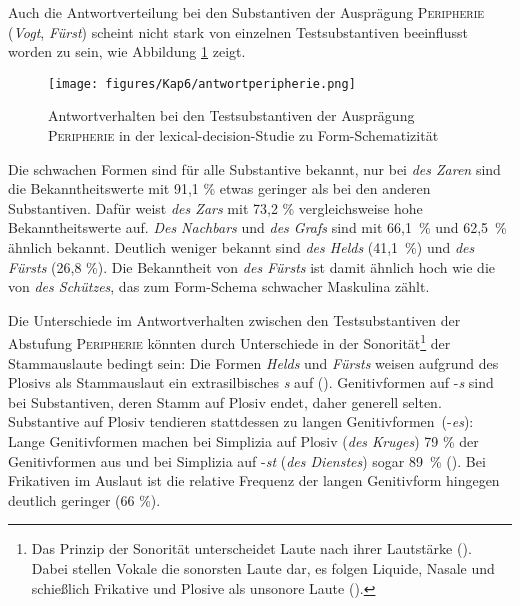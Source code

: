 Auch die Antwortverteilung bei den Substantiven der Ausprägung \textsc{Peripherie} (\textit{Vogt}, \textit{Fürst}) scheint nicht stark von einzelnen Testsubstantiven beeinflusst worden zu sein, wie Abbildung \ref{schemaantperi} zeigt.

\begin{figure}
\texttt{[image: figures/Kap6/antwortperipherie.png]} 
\caption{Antwortverhalten bei den Testsubstantiven der Ausprägung \textsc{Peripherie} in der lexical-decision-Studie zu Form-Schematizität}
\label{schemaantperi}
\end{figure}

Die schwachen Formen sind für alle Substantive bekannt, nur bei \textit{des Zaren} sind die Bekanntheitswerte mit 91,1 \% etwas geringer als bei den anderen Substantiven. Dafür weist \textit{des Zars} mit 73,2 \% vergleichsweise hohe Bekanntheitswerte auf. \textit{Des Nachbars} und \textit{des Grafs} sind mit 66,1~\% und 62,5~\% ähnlich bekannt. Deutlich weniger bekannt sind \textit{des Helds} (41,1~\%) und \textit{des Fürsts} (26,8 \%). Die Bekanntheit von \textit{des Fürsts} ist damit ähnlich hoch wie die von \textit{des Schützes}, das zum Form-Schema schwacher Maskulina zählt.

 
Die Unterschiede im Antwortverhalten zwischen den Testsubstantiven der Abstufung \textsc{Peripherie} könnten durch Unterschiede in der Sonorität\footnote{Das Prinzip der Sonorität unterscheidet Laute nach ihrer Lautstärke (\cite[107]{Szczepaniak.2010}). Dabei stellen Vokale die sonorsten Laute dar, es folgen Liquide, Nasale und schießlich Frikative und Plosive als unsonore Laute (\cite[167]{Vennemann.1987}).} der Stammauslaute bedingt sein: Die Formen \textit{Helds} und \textit{Fürsts} weisen aufgrund des Plosivs als Stammauslaut ein extrasilbisches \textit{s} auf (\cite[114]{Szczepaniak.2010}). Genitivformen auf -\textit{s} sind bei Substantiven, deren Stamm auf Plosiv endet, daher generell selten. Substantive auf Plosiv tendieren stattdessen zu langen Genitivfor\-\mbox{men~(-\textit{es}}): Lange Genitivformen machen bei Simplizia auf Plosiv (\textit{des Kruges}) 79 \%  der Genitivformen aus und bei Simplizia auf -\textit{st} (\textit{des Dienstes}) sogar 89~\%  (\cite[113]{Szczepaniak.2010}). Bei Frikativen im Auslaut ist die relative Frequenz der langen Genitivform hingegen deutlich geringer (66 \%).

